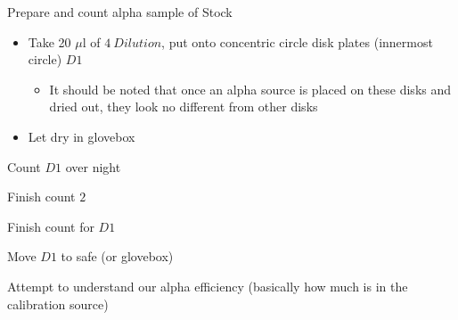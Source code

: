 \documentclass[idxtotoc,hyperref,openany,oneside]{labbook} %
\newcommand{\cmark}{\ding{51}}%
\newcommand{\done}{\rlap{$\square$}{\raisebox{2pt}{\large\hspace{1pt}\cmark}}%
  \hspace{-2.5pt}}
\begin{document}
\begin{todolist}
\item[\done]{Prepare and count alpha sample of Stock}
  \begin{itemize}
  \item{Take 20 $\mu$l of $\boxed{4\ Dilution}$, put onto
  concentric circle disk plates (innermost circle) $\boxed{D1}$}
    \begin{itemize}
    \item{It should be noted that once an alpha source is
      placed on these disks and dried out, they look no different
      from other disks}
    \end{itemize}
  \item{Let dry in glovebox}
  \end{itemize}
\item[\done]{Count $\boxed{D1}$ over night}
\end{todolist}




\begin{todolist}
\item[\done]{Finish count $\boxed{2}$}
\end{todolist}

\begin{todolist}
\item[\done]{Finish count for $\boxed{D1}$}
\item[\done]{Move $\boxed{D1}$ to safe (or glovebox)}
\end{todolist}

\begin{todolist}
\item{Attempt to understand our alpha efficiency (basically
  how much is in the calibration source)}
\end{todolist}


\end{document}
